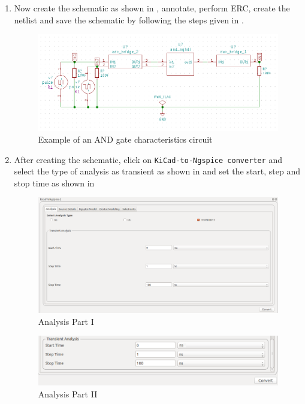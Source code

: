 \begin{enumerate}
\item Now create the schematic as shown in , annotate, perform ERC, create the netlist and save the schematic by following the steps given in .
\begin{figure}[!htp]
            \centering
            \includegraphics[width =\hgfig]{./NGHDL/screen14.png}
            \caption{Example of an AND gate characteristics circuit}
            \label{screen14}
        \end{figure}

\item After creating the schematic, click on \texttt{KiCad-to-Ngspice converter} and select the type of analysis as transient as shown in  and set the start, step and stop time as shown in 
   \begin{figure}[!htp]
                \centering
                \includegraphics[width =\hgfig]{./NGHDL/screen15.png}
                \caption{Analysis Part I}
                \label{screen15}
            \end{figure}
           \begin{figure}[!htp]
            \centering
            \includegraphics[width =\hgfig]{./NGHDL/screen16.png}
            \caption{Analysis Part II}
            \label{screen16}
        \end{figure}
\pagebreak


\end{enumerate}
